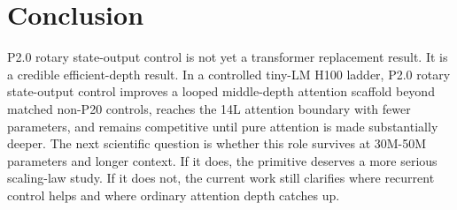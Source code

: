 \documentclass[11pt]{article}
\newcommand{\pshort}{P20}
\newcommand{\pcontrol}{P2.0 rotary state-output control}
\begin{document}
\section{Conclusion}

\pcontrol{} is not yet a transformer replacement result. It is a credible
efficient-depth result. In a controlled tiny-LM H100 ladder, \pcontrol{}
improves a looped middle-depth attention scaffold beyond matched non-\pshort{}
controls, reaches the 14L attention boundary with fewer parameters, and remains
competitive until pure attention is made substantially deeper. The next
scientific question is whether this role survives at 30M-50M parameters and
longer context. If it does, the primitive deserves a more serious scaling-law
study. If it does not, the current work still clarifies where recurrent control
helps and where ordinary attention depth catches up.



\end{document}
